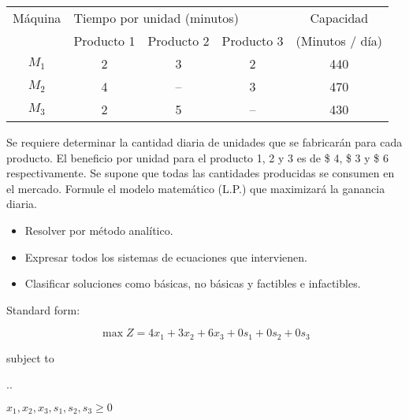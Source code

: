 \documentclass[spanish,letterpaper,11pt]{exam}
\begin{document}
\begin{questions}
  {\centering
      \begin{tabular}{ccccc}
        \toprule
        Máquina & \multicolumn{3}{l}{Tiempo por unidad (minutos)} & Capacidad       \\
                &  Producto 1             &    Producto 2            &     Producto 3           & (Minutos / día) \\
        \midrule
        $M_1$   & 2             & 3              & 2              & 440             \\
        $M_2$   & 4             & --             & 3              & 470             \\
        $M_3$   & 2             & 5              & --             & 430\\
        \bottomrule
      \end{tabular}
    \par}
  

   Se requiere determinar la cantidad diaria de unidades que se fabricarán para cada producto. El beneficio por unidad para el producto 1, 2 y 3 es de \$ 4, \$ 3 y \$ 6 respectivamente. Se supone que todas las cantidades producidas se consumen en el mercado. Formule el modelo matemático (L.P.) que maximizará la ganancia diaria. 
   
   \begin{itemize}
       \item Resolver por método analítico. 
       \item Expresar todos los sistemas de ecuaciones que intervienen. 
       \item Clasificar soluciones como básicas, no básicas y factibles e infactibles.
   \end{itemize}

   \begin{solution}
       
    Standard form: 

        \[ \max Z = 4x_1 + 3x_2 + 6x_3 + 0s_1 + 0s_2 + 0s_3\]
        {\centering
          subject to
        
          \sysdelim..%

          $x_1, x_2, x_3, s_1, s_2, s_3 \geq 0$
          
          \par}
          

\end{solution}
\end{questions}
\end{document}
